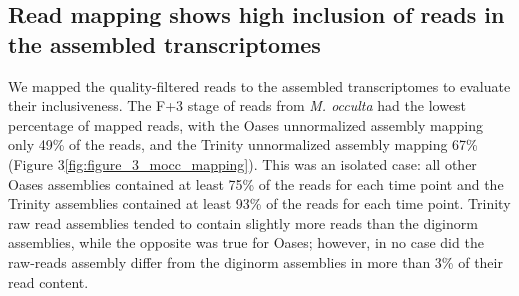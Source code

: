 \documentclass[fleqn,10pt]{wlpeerj}
\begin{document}
\subsection{Read mapping shows high inclusion of reads in the assembled transcriptomes}
	We mapped the quality-filtered reads to the assembled transcriptomes to evaluate their inclusiveness. The F+3 stage of reads from \textit{M. occulta} had the lowest percentage of mapped reads, with the Oases unnormalized assembly mapping only 49\% of the reads, and the Trinity unnormalized assembly mapping 67\% (Figure 3\ref{fig:figure_3_mocc_mapping}). This was an isolated case: all other Oases assemblies contained at least 75\% of the reads for each time point and the Trinity assemblies contained at least 93\% of the reads for each time point. Trinity raw read assemblies tended to contain slightly more reads than the diginorm assemblies, while the opposite was true for Oases; however, in no case did the raw-reads assembly differ from the diginorm assemblies in more than 3\% of their read content.
\setcounter{subfigure}{0}
\end{document}
